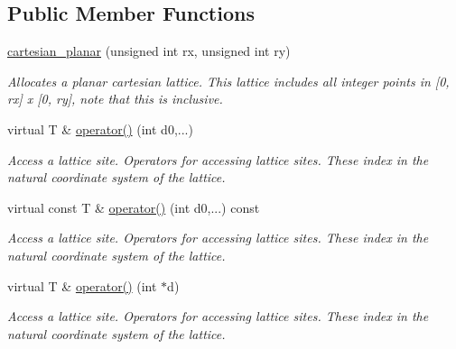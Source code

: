 \subsection*{Public Member Functions}
\begin{DoxyCompactItemize}
\item 
\mbox{\label{classsisl_1_1cartesian__planar_a4a18370588a67dac362c748d7bd46b04}} 
\hyperlink{classsisl_1_1cartesian__planar_a4a18370588a67dac362c748d7bd46b04}{cartesian\+\_\+planar} (unsigned int rx, unsigned int ry)
\begin{DoxyCompactList}\small\item\em Allocates a planar cartesian lattice. This lattice includes all integer points in \mbox{[}0, rx\mbox{]} x \mbox{[}0, ry\mbox{]}, note that this is inclusive. \end{DoxyCompactList}\item 
\mbox{\label{classsisl_1_1cartesian__planar_a1e1a3b1c44748218d601edbdf1bed2d8}} 
virtual T \& \hyperlink{classsisl_1_1cartesian__planar_a1e1a3b1c44748218d601edbdf1bed2d8}{operator()} (int d0,...)
\begin{DoxyCompactList}\small\item\em Access a lattice site. Operators for accessing lattice sites. These index in the natural coordinate system of the lattice. \end{DoxyCompactList}\item 
\mbox{\label{classsisl_1_1cartesian__planar_a92169a5cd0efd070fcadb9108b7fee0d}} 
virtual const T \& \hyperlink{classsisl_1_1cartesian__planar_a92169a5cd0efd070fcadb9108b7fee0d}{operator()} (int d0,...) const
\begin{DoxyCompactList}\small\item\em Access a lattice site. Operators for accessing lattice sites. These index in the natural coordinate system of the lattice. \end{DoxyCompactList}\item 
\mbox{\label{classsisl_1_1cartesian__planar_a20ef7e8f23c0e6bfd1bfea5816a0d424}} 
virtual T \& \hyperlink{classsisl_1_1cartesian__planar_a20ef7e8f23c0e6bfd1bfea5816a0d424}{operator()} (int $\ast$d)
\begin{DoxyCompactList}\small\item\em Access a lattice site. Operators for accessing lattice sites. These index in the natural coordinate system of the lattice. \end{DoxyCompactList}\item 

\end{DoxyCompactItemize}
